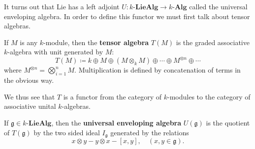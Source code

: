 It turns out that Lie has a left adjoint $ U: k\text{-}\mathbf{LieAlg} \to k\text{-}\mathbf{Alg} $ called the universal enveloping algebra. In order to define this functor we must first talk about tensor algebras.
\begin{definition}
  If $ M $ is any $ k $-module, then the \textbf{tensor algebra} $ T(M) $ is the graded associative $ k $-algebra with unit generated by $ M $:
  \begin{equation}
    T(M) \coloneqq k \oplus M \oplus (M \otimes_k M) \oplus \cdots \oplus M^{\otimes n} \oplus \cdots
    \label{eq:gaa}
  \end{equation}
  where $ M^{\otimes n} = \bigotimes_{i = 1}^{n} M $. Multiplication is defined by concatenation of terms in the obvious way.
\end{definition}
We thus see that $ T $ is a functor from the category of $ k $-modules to the category of associative unital $ k $-algebras.
\begin{definition}
  If $ \mathfrak{g} \in k\text{-}\mathbf{LieAlg} $, then the \textbf{universal enveloping algebra} $ U(\mathfrak{g}) $ is the quotient of $ T(\mathfrak{g}) $ by the two sided ideal $ I_\mathfrak{g} $ generated by the relations
  \begin{equation}
    x \otimes y - y \otimes x - [x,y],\quad (x,y \in \mathfrak{g}).
    \label{eq:relations}
  \end{equation}
\end{definition}

